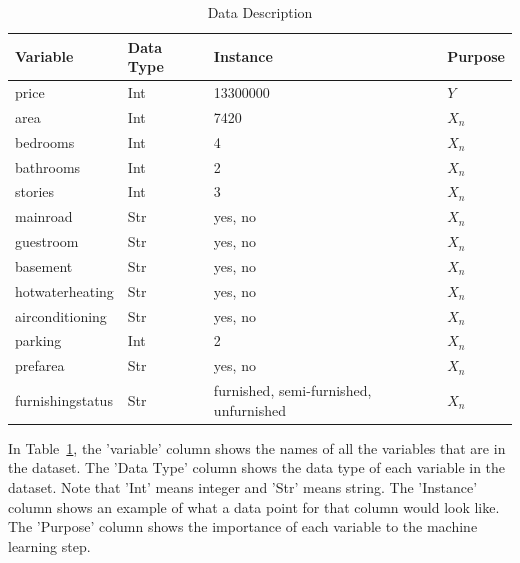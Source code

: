 \documentclass[12pt]{article}
\begin{document}
\begin{table}[h!]
\caption{Data Description}
  \label{tab:rv}
\begin{tabular}{llll}
  \toprule
Variable & Data Type & Instance & Purpose \\
  \midrule
price & Int & 13300000 & \(Y\) \\ 
area & Int & 7420 & \(X_{n}\) \\ 
bedrooms & Int & 4 & \(X_{n}\) \\ 
bathrooms & Int & 2 & \(X_{n}\) \\ 
stories & Int & 3 & \(X_{n}\) \\ 
mainroad & Str & yes, no & \(X_{n}\) \\
guestroom & Str & yes, no & \(X_{n}\) \\
basement & Str & yes, no & \(X_{n}\) \\
hotwaterheating & Str & yes, no & \(X_{n}\) \\
airconditioning & Str & yes, no & \(X_{n}\) \\
parking & Int & 2 & \(X_{n}\) \\
prefarea & Str & yes, no & \(X_{n}\) \\
furnishingstatus & Str & furnished, semi-furnished, unfurnished & \(X_{n}\) \\
   \bottomrule
\end{tabular}\par
\bigskip
In Table~\ref{tab:rv}, the 'variable' column shows the names of all the variables that are in the dataset. The 'Data Type' column shows the data type of each variable in the dataset. Note that 'Int' means integer and 'Str' means string. The 'Instance' column shows an example of what a data point for that column would look like. The 'Purpose' column shows the importance of each variable to the machine learning step.
\end{table}
\end{document}
